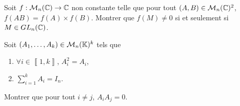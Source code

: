 \documentclass[12pt]{article}
\begin{document}
\begin{exercise}
	Soit $f:\mathcal{M}_{n}(\mathbb{C})\to\mathbb{C}$ non constante telle que pour tout $(A,B)\in\mathcal{M}_{n}(\mathbb{C})^{2}$, $f(AB)=f(A)\times f(B)$. 
	Montrer que $f(M)\neq0$ si et seulement si $M\in GL_{n}(\mathbb{C})$.
\end{exercise}

\begin{exercise}
	Soit $(A_{1},\dots,A_{k})\in\mathcal{M}_n(\mathbb{K})^{k}$ tels que
	\begin{enumerate}[label=(\roman*)]
		\item $\forall i\in\left\llbracket1,k\right\rrbracket$, $A_{i}^{2}=A_{i}$,
		\item $\sum_{i=1}^{k}A_i=I_n$.
	\end{enumerate}
	Montrer que pour tout $i\neq j$, $A_iA_j=0$.
\end{exercise}
\end{document}
